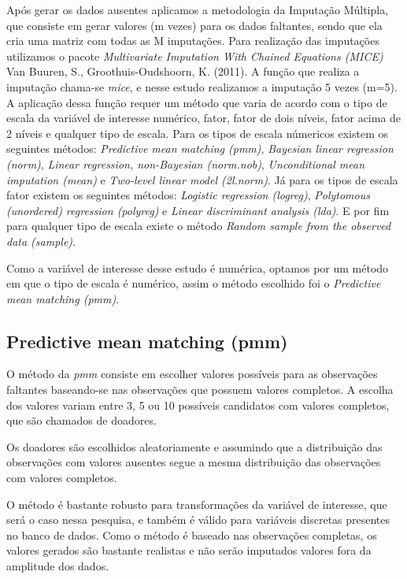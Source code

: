 \documentclass[]{article}
\begin{document}
Após gerar os dados ausentes aplicamos a metodologia da Imputação
Múltipla, que consiste em gerar valores (m vezes) para os dados
faltantes, sendo que ela cria uma matriz com todas as M imputações. Para
realização das imputações utilizamos o pacote \emph{Multivariate
Imputation With Chained Equations (MICE)} Van Buuren, S.,
Groothuis-Oudshoorn, K. (2011). A função que realiza a imputação
chama-se \emph{mice}, e nesse estudo realizamos a imputação 5 vezes
(m=5). A aplicação dessa função requer um método que varia de acordo com
o tipo de escala da variável de interesse numérico, fator, fator de dois
níveis, fator acima de 2 níveis e qualquer tipo de escala. Para os tipos
de escala númericos existem os seguintes métodos: \emph{Predictive mean
matching (pmm)}, \emph{Bayesian linear regression (norm)}, \emph{Linear
regression, non-Bayesian (norm.nob)}, \emph{Unconditional mean
imputation (mean)} e \emph{Two-level linear model (2l.norm)}. Já para os
tipos de escala fator existem os seguintes métodos: \emph{Logistic
regression (logreg)}, \emph{Polytomous (unordered) regression (polyreg)}
e \emph{Linear discriminant analysis (lda)}. E por fim para qualquer
tipo de escala existe o método \emph{Random sample from the observed
data (sample)}.

Como a variável de interesse desse estudo é numérica, optamos por um
método em que o tipo de escala é numérico, assim o método escolhido foi
o \emph{Predictive mean matching (pmm)}.

\subsection{Predictive mean matching
(pmm)}\label{predictive-mean-matching-pmm}

O método da \emph{pmm} consiste em escolher valores possíveis para as
observações faltantes baseando-se nas observações que possuem valores
completos. A escolha dos valores variam entre 3, 5 ou 10 possíveis
candidatos com valores completos, que são chamados de doadores.

Os doadores são escolhidos aleatoriamente e assumindo que a distribuição
das observações com valores ausentes segue a mesma distribuição das
observações com valores completos.

O método é bastante robusto para transformações da variável de
interesse, que será o caso nessa pesquisa, e também é válido para
variáveis discretas presentes no banco de dados. Como o método é baseado
nas observações completas, os valores gerados são bastante realistas e
não serão imputados valores fora da amplitude dos dados.
\end{document}
